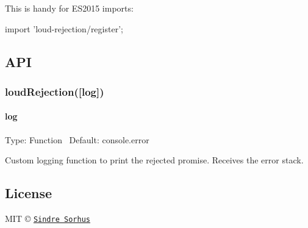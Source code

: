 This is handy for E\+S2015 imports\+:


\begin{DoxyCode}
import 'loud-rejection/register';
\end{DoxyCode}


\subsection*{A\+PI}

\subsubsection*{loud\+Rejection(\mbox{[}log\mbox{]})}

\paragraph*{log}

Type\+: {\ttfamily Function}~\newline
 Default\+: {\ttfamily console.\+error}

Custom logging function to print the rejected promise. Receives the error stack.

\subsection*{License}

M\+IT © \href{https://sindresorhus.com}{\tt Sindre Sorhus} 